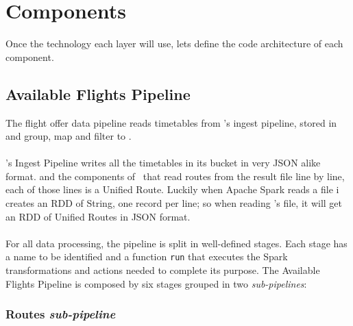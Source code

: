 



\section{Components}

Once the technology each layer will use, lets define the code architecture of each component.

\subsection{Available Flights Pipeline} \label{available-flights-pipeline}

The flight offer data pipeline reads timetables from \squad's ingest pipeline, stored in  and group, map and filter to .
\\\\
\squad's Ingest Pipeline writes all the timetables in its  bucket in very JSON\cite{json} alike format.  and the components of \squad\ that read routes from the result file line by line, each of those lines is a Unified Route. Luckily when Apache Spark reads a file i creates an RDD of String, one record per line; so when reading \squad's file, it will get an RDD of Unified Routes in JSON\cite{json} format.
\\\\
For all data processing, the pipeline is split in well-defined stages. Each stage has a name to be identified and a function \texttt{run} that executes the Spark transformations and actions needed to complete its purpose. The Available Flights Pipeline is composed by six stages grouped in two \textit{sub-pipelines}:

\subsubsection*{Routes \textit{sub-pipeline}}

